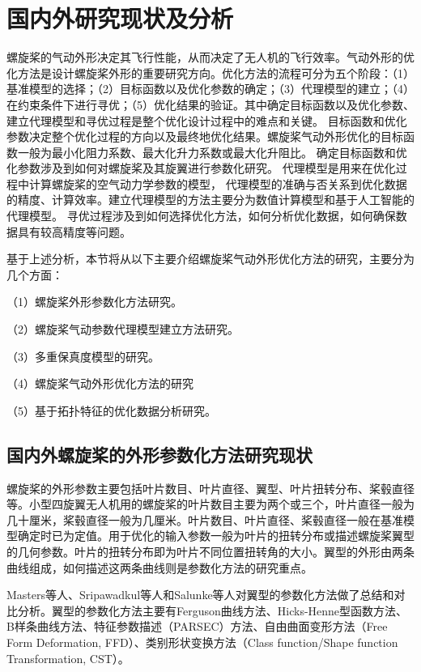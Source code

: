 \vspace{0.8em}
\section{国内外研究现状及分析}\label{Sec: literature review}
\vspace{0.8em}

螺旋桨的气动外形决定其飞行性能，从而决定了无人机的飞行效率。气动外形的优化方法是设计螺旋桨外形的重要研究方向。优化方法的流程可分为五个阶段：（1）基准模型的选择；（2）目标函数以及优化参数的确定；（3）代理模型的建立；（4）在约束条件下进行寻优；（5）优化结果的验证。其中确定目标函数以及优化参数、建立代理模型和寻优过程是整个优化设计过程中的难点和关键。
目标函数和优化参数决定整个优化过程的方向以及最终地优化结果。螺旋桨气动外形优化的目标函数一般为最小化阻力系数、最大化升力系数或最大化升阻比。
确定目标函数和优化参数涉及到如何对螺旋桨及其旋翼进行参数化研究。
代理模型是用来在优化过程中计算螺旋桨的空气动力学参数的模型，
代理模型的准确与否关系到优化数据的精度、计算效率。建立代理模型的方法主要分为数值计算模型和基于人工智能的代理模型。
寻优过程涉及到如何选择优化方法，如何分析优化数据，如何确保数据具有较高精度等问题。

基于上述分析，本节将从以下主要介绍螺旋桨气动外形优化方法的研究，主要分为几个方面：

（1）螺旋桨外形参数化方法研究。

（2）螺旋桨气动参数代理模型建立方法研究。

（3）多重保真度模型的研究。

（4）螺旋桨气动外形优化方法的研究

（5）基于拓扑特征的优化数据分析研究。


\vspace{0.8em}
\subsection{国内外螺旋桨的外形参数化方法研究现状}\label{Sec: shape parameter}
\vspace{0.8em}

螺旋桨的外形参数主要包括叶片数目、叶片直径、翼型、叶片扭转分布、桨毂直径等。小型四旋翼无人机用的螺旋桨的叶片数目主要为两个或三个，叶片直径一般为几十厘米，桨毂直径一般为几厘米。叶片数目、叶片直径、桨毂直径一般在基准模型确定时已为定值。用于优化的输入参数一般为叶片的扭转分布或描述螺旋桨翼型的几何参数。叶片的扭转分布即为叶片不同位置扭转角的大小。翼型的外形由两条曲线组成，如何描述这两条曲线则是参数化方法的研究重点。

Masters等人\cite{Dominic2015, Masters2017}、Sripawadkul等人\cite{Vis2010}和Salunke等人\cite{Salunke2014}对翼型的参数化方法做了总结和对比分析。翼型的参数化方法主要有Ferguson曲线方法\cite{Ferguson1964}、Hicks-Henne型函数方法\cite{Hicks1978}、B样条曲线方法\cite{Farin1997}、特征参数描述（PARSEC）方法\cite{Sobieczky1999}、自由曲面变形方法（Free Form Deformation, FFD）\cite{Thomas1986}、类别形状变换方法（Class function/Shape function Transformation, CST）\cite{Kulfan2006}。

